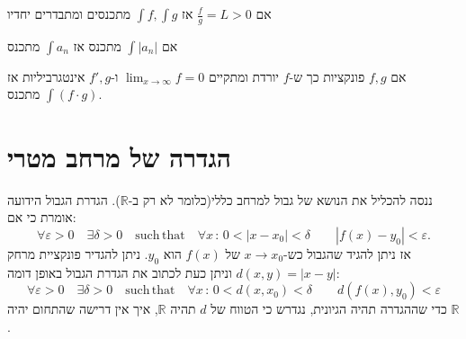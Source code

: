 \documentclass{tstextbook}
\begin{document}
\begin{proposition}
אם \(\frac{f}{g} = L > 0\) אז \(\int f, \int g\) מתכנסים ומתבדרים יחדיו

\end{proposition}
\begin{definition}
אם \(\int |a_n|\) מתכנס אז \(\int a_n\) מתכנס

\end{definition}
\begin{proposition}
אם \(f,g\) פונקציות כך ש-\(f\) יורדת ומתקיים \(\lim_{x\rightarrow \infty} f = 0\) ו-\(f', g\) אינטגרביליות אז \(\int (f\cdot g)\) מתכנס.

\end{proposition}
\begin{proposition}
\end{proposition}

\section{הגדרה של מרחב מטרי}

ננסה להכליל את הנושא של גבול למרחב כללי(כלומר לא רק ב-\(\mathbb{R}\)). הגדרת הגבול הידועה אומרת כי אם:
$$\forall\varepsilon>0\quad\exists\delta>0\quad\mathrm{such\,that}\quad\forall x\,:\,0<\left|x-x_{0}\right|<\delta\qquad\left|f(x)-y_{0}\right|<\varepsilon.$$
אז ניתן להגיד שהגבול כש-\(x\to x_{0}\)  של \(f(x)\) הוא \(y_{0}\). ניתן להגדיר פונקציית מרחק \(d(x,y)=|x-y|\) וניתן כעת לכתוב את הגדרת הגבול באופן דומה:
$$\forall\varepsilon>0\quad\exists\delta>0\quad\mathrm{such\,that}\quad\forall x\,:\,0<d(x,x_{0})<\delta\qquad d(f(x),y_{0})<\varepsilon$$
כדי שההגדרה תהיה הגיונית, נגדרש כי הטווח של \(d\) תהיה \(\mathbb{R}\), איך אין דרישה שהתחום יהיה \(\mathbb{R}\).
\end{document}

